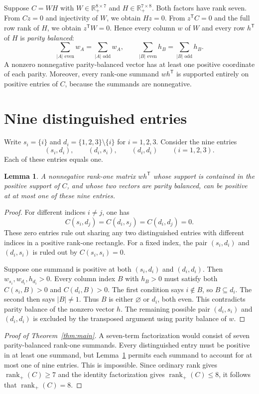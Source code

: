 \documentclass[11pt]{article}
\newtheorem{lemma}[theorem]{Lemma}
\newcommand{\rank}{\operatorname{rank}}
\begin{document}
Suppose $C=WH$ with $W\in\mathbb R_+^{8\times7}$ and $H\in\mathbb R_+^{7\times8}$. Both factors have rank seven. From $Cz=0$ and injectivity of $W$, we obtain $Hz=0$. From $z^{\mathsf T}C=0$ and the full row rank of $H$, we obtain $z^{\mathsf T}W=0$. Hence every column $w$ of $W$ and every row $h^{\mathsf T}$ of $H$ is \emph{parity balanced}:
\[
 \sum_{|A|\text{ even}}w_A=\sum_{|A|\text{ odd}}w_A,
 \qquad
 \sum_{|B|\text{ even}}h_B=\sum_{|B|\text{ odd}}h_B.
\]
A nonzero nonnegative parity-balanced vector has at least one positive coordinate of each parity. Moreover, every rank-one summand $wh^{\mathsf T}$ is supported entirely on positive entries of $C$, because the summands are nonnegative.

\section{Nine distinguished entries}
Write $s_i=\{i\}$ and $d_i=\{1,2,3\}\setminus\{i\}$ for $i=1,2,3$. Consider the nine entries
\[
 (s_i,d_i),\qquad(d_i,s_i),\qquad(d_i,d_i)
 \qquad(i=1,2,3).
\]
Each of these entries equals one.

\begin{lemma}\label{lem:nine}
A nonnegative rank-one matrix $wh^{\mathsf T}$ whose support is contained in the positive support of $C$, and whose two vectors are parity balanced, can be positive at at most one of these nine entries.
\end{lemma}
\begin{proof}
For different indices $i\ne j$, one has
\[
 C(s_i,d_j)=C(d_i,s_j)=C(d_i,d_j)=0.
\]
These zero entries rule out sharing any two distinguished entries with different indices in a positive rank-one rectangle. For a fixed index, the pair $(s_i,d_i)$ and $(d_i,s_i)$ is ruled out by $C(s_i,s_i)=0$.

Suppose one summand is positive at both $(s_i,d_i)$ and $(d_i,d_i)$. Then $w_{s_i},w_{d_i},h_{d_i}>0$. Every column index $B$ with $h_B>0$ must satisfy both $C(s_i,B)>0$ and $C(d_i,B)>0$. The first condition says $i\notin B$, so $B\subseteq d_i$. The second then says $|B|\ne1$. Thus $B$ is either $\varnothing$ or $d_i$, both even. This contradicts parity balance of the nonzero vector $h$. The remaining possible pair $(d_i,s_i)$ and $(d_i,d_i)$ is excluded by the transposed argument using parity balance of $w$.
\end{proof}

\begin{proof}[Proof of Theorem~\ref{thm:main}]
A seven-term factorization would consist of seven parity-balanced rank-one summands. Every distinguished entry must be positive in at least one summand, but Lemma~\ref{lem:nine} permits each summand to account for at most one of nine entries. This is impossible. Since ordinary rank gives $\rank_+(C)\geq7$ and the identity factorization gives $\rank_+(C)\leq8$, it follows that $\rank_+(C)=8$.
\end{proof}
\end{document}
